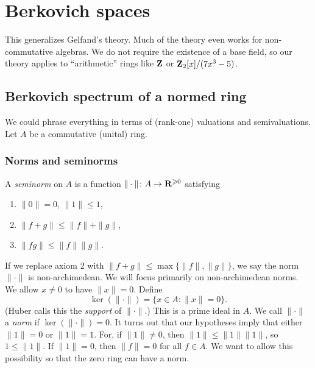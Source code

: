 
\chapter{Berkovich spaces}

This generalizes Gelfand's theory. Much of the theory even works for 
non-commutative algebras. We do not require the existence of a base field, so 
our theory applies to ``arithmetic'' rings like $\mathbf{Z}$ or 
$\mathbf{Z}_2[x]/(7 x^3-5)$. 





\section{Berkovich spectrum of a normed ring}

We could phrase everything in terms of (rank-one) valuations and semivaluations.
Let $A$ be a commutative (unital) ring. 


\subsection{Norms and seminorms}

\begin{definition}
A \emph{seminorm} on $A$ is a function $\|\cdot\|\colon A\to \mathbf{R}^{\geqslant 0}$ 
satisfying 
\begin{enumerate}
\item
$\|0\|=0$, $\|1\|\leqslant 1$, 

\item
$\|f+g\|\leqslant \|f\|+\|g\|$, 

\item
$\|f g\| \leqslant \|f\| \|g\|$. 
\end{enumerate}
\end{definition}

If we replace axiom 2 with $\|f+g\| \leqslant \max\{\|f\|,\|g\|\}$, we say the 
norm $\|\cdot\|$ is non-archimedean. We will focus primarily on non-archimedean 
norms. We allow $x\ne 0$ to have $\|x\|=0$. Define 
\[
  \ker(\|\cdot\|) = \{x\in A\colon \|x\| = 0\} .
\]
(Huber calls this the \emph{support} of $\|\cdot\|$.) This is a prime ideal in 
$A$. We call $\|\cdot\|$ a \emph{norm} if $\ker(\|\cdot\|)=0$. It turns out 
that our hypotheses imply that either $\|1\|=0$ or $\|1\|=1$. For, if 
$\|1\|\ne 0$, then $\|1\| \leqslant \|1\|\|1\|$, so $1\leqslant \|1\|$. If 
$\|1\|=0$, then $\|f\|=0$ for all $f\in A$. We want to allow this possibility 
so that the zero ring can have a norm. 

